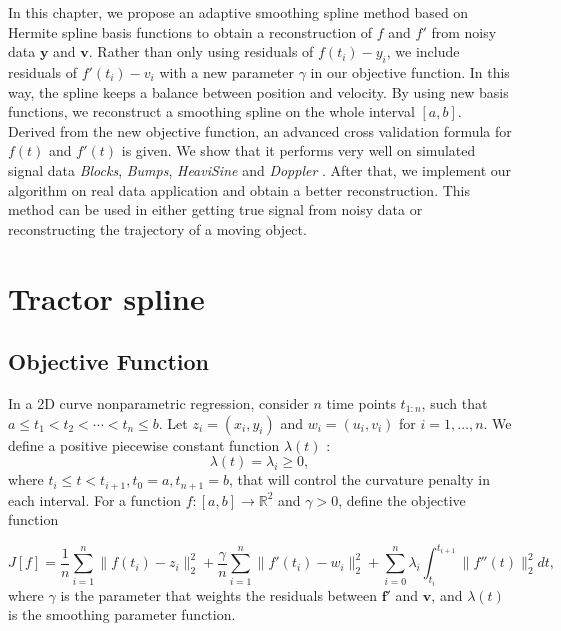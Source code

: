 In this chapter, we propose an adaptive smoothing spline method based on Hermite spline basis functions to obtain a reconstruction of $f$ and $f'$ from noisy data $\mathbf{y}$ and $\mathbf{v}$. Rather than only using residuals of $f(t_i)-y_i$, we include residuals of $f'(t_i)-v_i$ with a new parameter $\gamma$ in our objective function. In this way, the spline keeps a balance between position and velocity. By using new basis functions, we reconstruct a smoothing spline on the whole interval $[a,b]$. Derived from the new objective function, an advanced cross validation formula for $f(t)$ and $f'(t)$ is given. We show that it performs very well on simulated signal data \textit{Blocks}, \textit{Bumps}, \textit{HeaviSine} and \textit{Doppler} \cite{donoho1994ideal}. After that, we implement our algorithm on real data application and obtain a better reconstruction. This method can be used in either getting true signal from noisy data or reconstructing the trajectory of a moving object. 


\section{Tractor spline}\label{SectionTractorSpline}

\subsection{Objective Function}

In a 2D curve nonparametric regression, consider $n$  time points $t_{1:n}$, such that $a \leq t_1<t_2< \cdots < t_n \leq b$. Let $z_i=(x_i,y_i)$ and $w_i=(u_i,v_i)$ for $i=1, \ldots, n$. We define a positive piecewise constant function $\lambda(t)$ :
\begin{equation}
\lambda(t) = \lambda_i \geq 0,
\end{equation}
where $t_i \leq t<t_{i+1}, t_0=a, t_{n+1}=b$, that will control the curvature penalty in each interval. For a function $f:[a,b]\longrightarrow \mathbb{R}^2$ and $\gamma>0$, define the objective function 

 \begin{equation}\label{tractorsplineObjective}
J[f]= \frac{1}{n} \sum_{i=1}^{n} \lVert f(t_i)-z_i\rVert_2^2 + \frac{\gamma}{n} \sum_{i=1}^{n} \lVert f'(t_i)-w_i \rVert_2^2 +\sum_{i=0}^{n} \lambda_i\int_{t_i}^{t_{i+1}} \lVert f''(t)\rVert_2^2 dt,
\end{equation}
where $\gamma$ is the parameter that weights the residuals between $\mathbf{f}'$ and $\mathbf{v}$, and $\lambda(t)$ is the smoothing parameter function.

